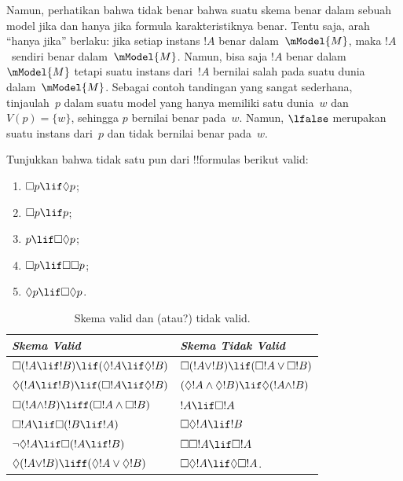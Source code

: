 \documentclass[../../../include/open-logic-section]{subfiles}
\begin{document}
Namun, perhatikan bahwa tidak benar bahwa suatu skema benar dalam sebuah
model jika dan hanya jika formula karakteristiknya benar. Tentu saja,
arah ``hanya jika'' berlaku: jika setiap instans $!A$ benar
dalam~$\mModel{M}$, maka $!A$~sendiri benar dalam~$\mModel{M}$. Namun, bisa
saja $!A$ benar dalam~$\mModel{M}$ tetapi suatu instans dari~$!A$ bernilai
salah pada suatu dunia dalam~$\mModel{M}$. Sebagai contoh tandingan yang
sangat sederhana, tinjaulah~$p$ dalam suatu model yang hanya memiliki satu
dunia~$w$ dan $V(p) = \{w\}$, sehingga $p$ bernilai benar pada~$w$. Namun,
$\lfalse$ merupakan suatu instans dari~$p$ dan tidak bernilai benar pada~$w$.

\begin{prob}
  Tunjukkan bahwa tidak satu pun dari !!{formula}s berikut valid:
  \begin{enumerate}
    \item[\Ax{D}:] \quad $\Box p \lif \Diamond p$;
    \item[\Ax{T}:] \quad $\Box p \lif p$;
    \item[\Ax{B}:] \quad $p \lif \Box\Diamond p$;
    \item[\Ax{4}:] \quad $\Box p \lif \Box \Box p$;
    \item[\Ax{5}:] \quad $\Diamond p \lif \Box \Diamond
      p$.
  \end{enumerate}
\end{prob}

\begin{table}[t]
    \centering
    \begin{tabular}{| l || l |}
      \hline
      {\emph{Skema Valid}} & {\emph{Skema Tidak Valid}} \\
      \hline\hline
      $\Box(!A \lif !B) \lif (\Diamond !A \lif \Diamond !B)$
      & $\Box (!A \lor !B) \lif (\Box !A \lor \Box !B)$ \\
      $\Diamond (!A \lif !B) \lif (\Box !A \lif \Diamond
      !B)$
      & $(\Diamond !A \land \Diamond !B) \lif \Diamond (!A
      \land !B)$\\
      $\Box (!A \land !B) \liff (\Box !A \land \Box !B)$
      & $!A \lif \Box !A$ \\
      $\Box !A \lif \Box (!B \lif !A)$
      & $\Box \Diamond !A \lif !B$ \\
      $\lnot \Diamond !A \lif \Box (!A \lif !B)$
      & $\Box \Box !A \lif \Box !A$ \\
      $\Diamond (!A \lor !B) \liff (\Diamond !A \lor
      \Diamond !B)$
      & $\Box \Diamond !A \lif \Diamond \Box !A$. \\
      \hline
    \end{tabular}
    \caption{Skema valid dan (atau?) tidak valid.}
\end{table}
\end{document}
